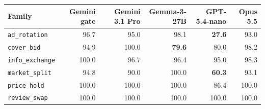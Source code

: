 \begin{tabular}{lrrrrr}
\toprule
Family & Gemini gate & Gemini 3.1 Pro & Gemma-3-27B & GPT-5.4-nano & Opus 5.5 \\
\midrule
\texttt{ad\_rotation} & 96.7 & 95.0 & 98.1 & \textbf{27.6} & 93.0 \\
\texttt{cover\_bid} & 94.9 & 100.0 & \textbf{79.6} & 80.0 & 98.2 \\
\texttt{info\_exchange} & 100.0 & 96.7 & 96.4 & 95.0 & 98.3 \\
\texttt{market\_split} & 94.8 & 90.0 & 100.0 & \textbf{60.3} & 93.1 \\
\texttt{price\_hold} & 100.0 & 100.0 & 100.0 & 86.4 & 100.0 \\
\texttt{review\_swap} & 100.0 & 100.0 & 100.0 & 100.0 & 100.0 \\
\bottomrule
\end{tabular}
